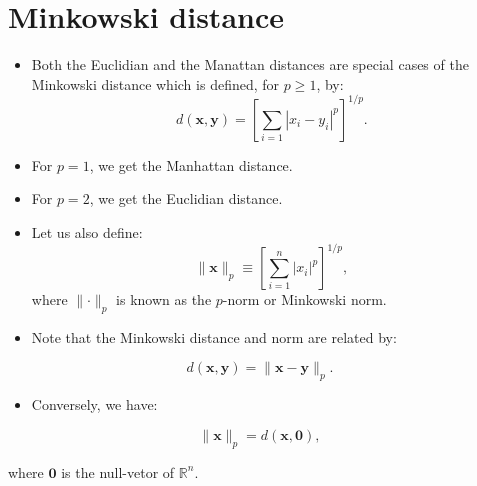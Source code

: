 \documentclass[
]{article}
\providecommand{\tightlist}{%
  \setlength{\itemsep}{0pt}\setlength{\parskip}{0pt}}
\begin{document}
\hypertarget{minkowski-distance}{%
\section{Minkowski distance}\label{minkowski-distance}}

\begin{itemize}
\tightlist
\item
  Both the Euclidian and the Manattan distances are special cases of the
  Minkowski distance which is defined, for \(p\geq 1\), by: \[
  d(\mathbf{x},\mathbf{y})=
  \left[\sum_{i=1} |x_i-y_i|^{p}\right]^{1/p}.
  \]
\item
  For \(p=1\), we get the Manhattan distance.
\item
  For \(p=2\), we get the Euclidian distance.
\item
  Let us also define:
  \[\|\mathbf{x}\|_p\equiv\left[\sum_{i=1}^n |x_i|^{p}\right]^{1/p},\]
  where \(\|\mathbf{\cdot}\|_p\) is known as the \(p\)-norm or Minkowski
  norm.
\item
  Note that the Minkowski distance and norm are related by:
\end{itemize}

\[d(\mathbf{x},\mathbf{y})=\|\mathbf{x}-\mathbf{y}\|_p.\]

\begin{itemize}
\tightlist
\item
  Conversely, we have:
\end{itemize}

\[\|\mathbf{x}\|_p=d(\mathbf{x},\mathbf{0}),\]

where \(\mathbf{0}\) is the null-vetor of \(\mathbb{R}^n\).
\end{document}
